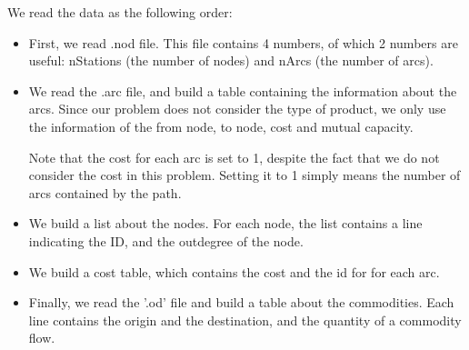 We read the data as the following order: 
\begin{itemize}
    \item First, we read .nod file. This file contains 4 numbers, of which 2 numbers are useful: nStations (the number of nodes) and nArcs (the number of arcs). 
    
    \item We read the .arc file, and build a table containing the information about the arcs. Since our problem does not consider the type of product, we only use the information of the from node, to node, cost and mutual capacity. 
    
    Note that the cost for each arc is set to 1, despite the fact that we do not consider the cost in this problem. Setting it to 1 simply means the number of arcs contained by the path.
    \item We build a list about the nodes. For each node, the list contains a line indicating the ID, and the outdegree of the node.
    \item We build a cost table, which contains the cost and the id for for each arc.
    \item Finally, we read the '.od' file and build a table about the commodities. Each line contains the origin and the destination, and the quantity of a commodity flow. 
    
    
    
\end{itemize}


